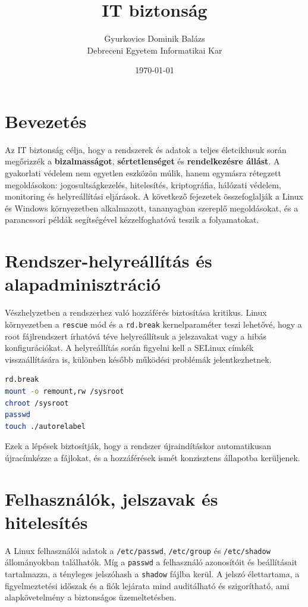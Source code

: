 \documentclass[12pt,a4paper]{article}
\title{IT biztonság}
\author{Gyurkovics Dominik Balázs\\Debreceni Egyetem Informatikai Kar}
\date{\today}
\begin{document}
\maketitle
\tableofcontents
\newpage

\section{Bevezetés}
Az IT biztonság célja, hogy a rendszerek és adatok a teljes életciklusuk során megőrizzék a \textbf{bizalmasságot}, \textbf{sértetlenséget} és \textbf{rendelkezésre állást}. A gyakorlati védelem nem egyetlen eszközön múlik, hanem egymásra rétegzett megoldásokon: jogosultságkezelés, hitelesítés, kriptográfia, hálózati védelem, monitoring és helyreállítási eljárások. A következő fejezetek összefoglalják a Linux és Windows környezetben alkalmazott, tananyagban szereplő megoldásokat, és a parancssori példák segítségével kézzelfoghatóvá teszik a folyamatokat.

\section{Rendszer-helyreállítás és alapadminisztráció}
Vészhelyzetben a rendszerhez való hozzáférés biztosítása kritikus. Linux környezetben a \texttt{rescue} mód és a \texttt{rd.break} kernelparaméter teszi lehetővé, hogy a root fájlrendszert írhatóvá téve helyreállítsuk a jelszavakat vagy a hibás konfigurációkat. A helyreállítás során figyelni kell a SELinux címkék visszaállítására is, különben később működési problémák jelentkezhetnek.

\begin{lstlisting}[language=bash,caption={Helyreállítási műveletek (cheatsheet részlet)}]
rd.break
mount -o remount,rw /sysroot
chroot /sysroot
passwd
touch ./autorelabel
\end{lstlisting}

Ezek a lépések biztosítják, hogy a rendszer újraindításkor automatikusan újracímkézze a fájlokat, és a hozzáférések ismét konzisztens állapotba kerüljenek.

\section{Felhasználók, jelszavak és hitelesítés}
A Linux felhasználói adatok a \texttt{/etc/passwd}, \texttt{/etc/group} és \texttt{/etc/shadow} állományokban találhatók. Míg a \texttt{passwd} a felhasználó azonosítóit és beállításait tartalmazza, a tényleges jelszóhash a \texttt{shadow} fájlba kerül. A jelszó élettartama, a figyelmeztetési időszak és a fiók lejárata mind auditálható és szigorítható, ami alapkövetelmény a biztonságos üzemeltetésben.
\end{document}

